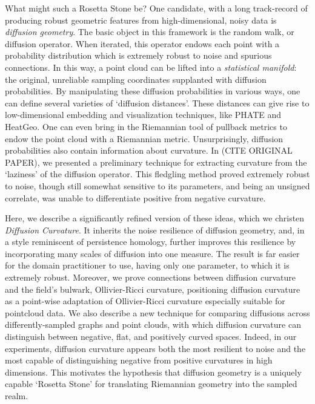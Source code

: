 \documentclass[
  letterpaper,
  DIV=11,
  numbers=noendperiod]{scrartcl}
\theoremstyle{plain}
\theoremstyle{plain}
\theoremstyle{definition}
\theoremstyle{plain}
\theoremstyle{definition}
\theoremstyle{plain}
\theoremstyle{remark}
\begin{document}
What might such a Rosetta Stone be? One candidate, with a long
track-record of producing robust geometric features from
high-dimensional, noisy data is \emph{diffusion geometry}. The basic
object in this framework is the random walk, or diffusion operator. When
iterated, this operator endows each point with a probability
distribution which is extremely robust to noise and spurious
connections. In this way, a point cloud can be lifted into a
\emph{statistical manifold}: the original, unreliable sampling
coordinates supplanted with diffusion probabilities. By manipulating
these diffusion probabilities in various ways, one can define several
varieties of `diffusion distances'. These distances can give rise to
low-dimensional embedding and visualization techniques, like PHATE and
HeatGeo. One can even bring in the Riemannian tool of pullback metrics
to endow the point cloud with a Riemannian metric. Unsurprisingly,
diffusion probabilities also contain information about curvature. In
(CITE ORIGINAL PAPER), we presented a preliminary technique for
extracting curvature from the `laziness' of the diffusion operator. This
fledgling method proved extremely robust to noise, though still somewhat
sensitive to its parameters, and being an unsigned correlate, was unable
to differentiate positive from negative curvature.

Here, we describe a significantly refined version of these ideas, which
we christen \emph{Diffusion Curvature}. It inherits the noise resilience
of diffusion geometry, and, in a style reminiscent of persistence
homology, further improves this resilience by incorporating many scales
of diffusion into one measure. The result is far easier for the domain
practitioner to use, having only one parameter, to which it is extremely
robust. Moreover, we prove connections between diffusion curvature and
the field's bulwark, Ollivier-Ricci curvature, positioning diffusion
curvature as a point-wise adaptation of Ollivier-Ricci curvature
especially suitable for pointcloud data. We also describe a new
technique for comparing diffusions across differently-sampled graphs and
point clouds, with which diffusion curvature can distinguish between
negative, flat, and positively curved spaces. Indeed, in our
experiments, diffusion curvature appears both the most resilient to
noise and the most capable of distinguishing negative from positive
curvatures in high dimensions. This motivates the hypothesis that
diffusion geometry is a uniquely capable `Rosetta Stone' for translating
Riemannian geometry into the sampled realm.
\end{document}
